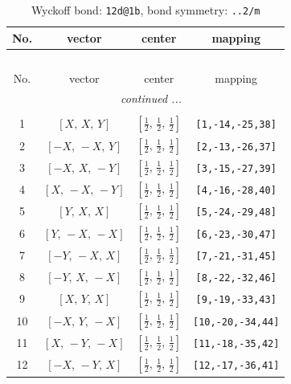 \documentclass[fleqn,8pt]{jsarticle}
\begin{document}
\begin{longtable}{cccc}
\caption{Wyckoff bond: {\tt 12d@1b}, bond symmetry: {\tt ..2/m}}
 \\
 \hline \hline
No. & vector & center & mapping \\ \hline \endfirsthead

\multicolumn{3}{l}{\tablename\ \thetable{}} \\
 \hline \hline
No. & vector & center & mapping \\ \hline \endhead

 \hline \hline
\multicolumn{3}{r}{\footnotesize\it continued ...} \\ \endfoot

 \hline \hline
\multicolumn{3}{r}{} \\ \endlastfoot

1 & $\left[ X,\, X,\, Y \right]$ & $\left[ \frac{1}{2},\, \frac{1}{2},\, \frac{1}{2} \right]$ & {\tt [1,-14,-25,38]} \\ \hline
2 & $\left[ - X,\, - X,\, Y \right]$ & $\left[ \frac{1}{2},\, \frac{1}{2},\, \frac{1}{2} \right]$ & {\tt [2,-13,-26,37]} \\ \hline
3 & $\left[ - X,\, X,\, - Y \right]$ & $\left[ \frac{1}{2},\, \frac{1}{2},\, \frac{1}{2} \right]$ & {\tt [3,-15,-27,39]} \\ \hline
4 & $\left[ X,\, - X,\, - Y \right]$ & $\left[ \frac{1}{2},\, \frac{1}{2},\, \frac{1}{2} \right]$ & {\tt [4,-16,-28,40]} \\ \hline
5 & $\left[ Y,\, X,\, X \right]$ & $\left[ \frac{1}{2},\, \frac{1}{2},\, \frac{1}{2} \right]$ & {\tt [5,-24,-29,48]} \\ \hline
6 & $\left[ Y,\, - X,\, - X \right]$ & $\left[ \frac{1}{2},\, \frac{1}{2},\, \frac{1}{2} \right]$ & {\tt [6,-23,-30,47]} \\ \hline
7 & $\left[ - Y,\, - X,\, X \right]$ & $\left[ \frac{1}{2},\, \frac{1}{2},\, \frac{1}{2} \right]$ & {\tt [7,-21,-31,45]} \\ \hline
8 & $\left[ - Y,\, X,\, - X \right]$ & $\left[ \frac{1}{2},\, \frac{1}{2},\, \frac{1}{2} \right]$ & {\tt [8,-22,-32,46]} \\ \hline
9 & $\left[ X,\, Y,\, X \right]$ & $\left[ \frac{1}{2},\, \frac{1}{2},\, \frac{1}{2} \right]$ & {\tt [9,-19,-33,43]} \\ \hline
10 & $\left[ - X,\, Y,\, - X \right]$ & $\left[ \frac{1}{2},\, \frac{1}{2},\, \frac{1}{2} \right]$ & {\tt [10,-20,-34,44]} \\ \hline
11 & $\left[ X,\, - Y,\, - X \right]$ & $\left[ \frac{1}{2},\, \frac{1}{2},\, \frac{1}{2} \right]$ & {\tt [11,-18,-35,42]} \\ \hline
12 & $\left[ - X,\, - Y,\, X \right]$ & $\left[ \frac{1}{2},\, \frac{1}{2},\, \frac{1}{2} \right]$ & {\tt [12,-17,-36,41]} \\
\end{longtable}
\end{document}
